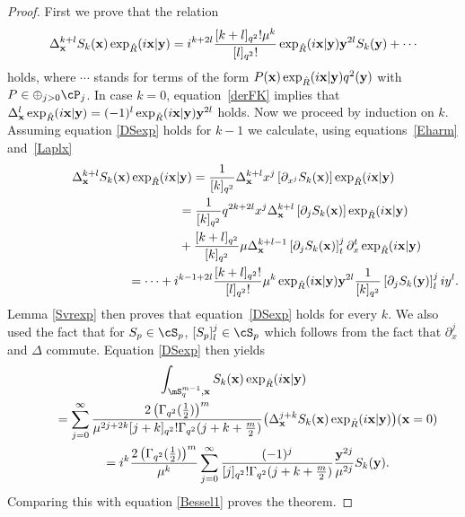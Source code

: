\begin{proof}
First we prove that the relation
\begin{gather}
\label{DSexp}
\Delta_{\bold{x}}^{k+l}S_k(\bold{x})\exp_{\hat{R}}(i\bold{x}|\bold{y})
=i^{k+2l}\frac{[k+l]_{q^2}!\mu^k}{[l]_{q^2}!}\exp_{\hat{R}}(i\bold{x}|\bold{y})\bold{y}^{2l}S_k(\bold{y})+\cdots
\end{gather}
holds, where $\cdots$ stands for terms of the form $P(\bold{x})\exp_{\hat{R}}(i\bold{x}|\bold{y})q^2(\bold{y})$ with $P\in\oplus_{j>0}\cP_j$. In case $k=0$, equation~\eqref{derFK} implies that $\Delta_{\bold{x}}^{l}\exp_{\hat{R}}(i\bold{x}|\bold{y})=(-1)^l\exp_{\hat{R}}(i\bold{x}|\bold{y})\bold{y}^{2l}$ holds. Now we proceed by induction on $k$. Assuming equation \eqref{DSexp} holds for $k-1$ we calculate, using equations~\eqref{Eharm} and~\eqref{Laplx}
\begin{gather*}
\Delta_{\bold{x}}^{k+l}S_k(\bold{x})\exp_{\hat{R}}(i\bold{x}|\bold{y})
= \frac{1}{[k]_{q^2}}\Delta_{\bold{x}}^{k+l}x^j\left[\partial_{x^j}S_k(\bold{x})\right]\exp_{\hat{R}}(i\bold{x}|\bold{y})\\
\phantom{\Delta_{\bold{x}}^{k+l}S_k(\bold{x})\exp_{\hat{R}}(i\bold{x}|\bold{y})}{}
=\frac{1}{[k]_{q^2}}q^{2k+2l}x^j\Delta_{\bold{x}}^{k+l}\left[\partial_{j}S_k(\bold{x})\right]\exp_{\hat{R}}(i\bold{x}|\bold{y})\\
\phantom{\Delta_{\bold{x}}^{k+l}S_k(\bold{x})\exp_{\hat{R}}(i\bold{x}|\bold{y})=}{}
+\frac{[k+l]_{q^2}}{[k]_{q^2}}\mu\Delta_{\bold{x}}^{k+l-1}\left[\partial_{j}S_k(\bold{x})\right]^j_t\partial_{x}^t\exp_{\hat{R}}(i\bold{x}|\bold{y})\\
\phantom{\Delta_{\bold{x}}^{k+l}S_k(\bold{x})\exp_{\hat{R}}(i\bold{x}|\bold{y})}{}
=\cdots+i^{k-1+2l}\frac{[k+l]_{q^2}!}{[l]_{q^2}!}\mu^{k}\exp_{\hat{R}}(i\bold{x}|\bold{y})\bold{y}^{2l}\frac{1}{[k]_{q^2}}\left[\partial_{j}S_k(\bold{y})\right]^j_liy^l.
\end{gather*}
Lemma \ref{Svrexp} then proves that equation~\eqref{DSexp} holds for every $k$. We also used the fact that for $S_p\in\cS_p$, $[S_p]^j_l\in\cS_p$ which follows from the fact that $\partial_x^j$ and $\Delta$ commute. Equation \eqref{DSexp} then yields
\begin{gather*}
\int_{\mS^{m-1}_q,\bold{x}}S_k(\bold{x})\exp_{\hat{R}}(i\bold{x}|\bold{y})\\
 \qquad{} = \sum_{j=0}^\infty\frac{2\left(\Gamma_{q^2}(\frac{1}{2})\right)^{m}}{\mu^{2j+2k}[j+k]_{q^2}!
\Gamma_{q^2}(j+k+\frac{m}{2})}\big(\Delta^{j+k}_{\bold{x}}S_k(\bold{x})\exp_{\hat{R}}(i\bold{x}|\bold{y})\big)(\bold{x}=0)\\
 \qquad{} = i^{k}\frac{2\left(\Gamma_{q^2}(\frac{1}{2})\right)^{m}}{\mu^k}
 \sum_{j=0}^\infty\frac{(-1)^j}{[j]_{q^2}!\Gamma_{q^2}(j+k+\frac{m}{2})}\frac{\bold{y}^{2j}}{\mu^{2j}}S_k(\bold{y}).
\end{gather*}
Comparing this with equation \eqref{Bessel1} proves the theorem.
\end{proof}


